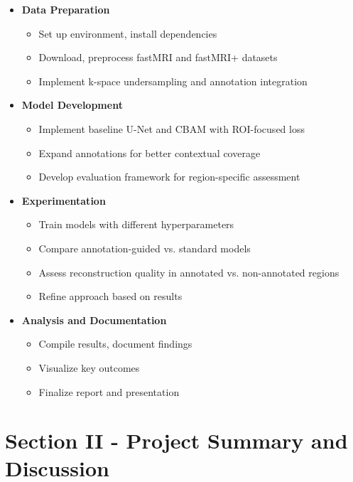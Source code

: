 \documentclass[
	letterpaper, %
]{jdf}
\begin{document}
\begin{itemize}
    \item \textbf{Data Preparation}
    \begin{itemize}
        \item Set up environment, install dependencies
        \item Download, preprocess fastMRI and fastMRI+ datasets
        \item Implement k-space undersampling and annotation integration
    \end{itemize}
    
    \item \textbf{Model Development}
    \begin{itemize}
        \item Implement baseline U-Net and CBAM with ROI-focused loss
        \item Expand annotations for better contextual coverage
        \item Develop evaluation framework for region-specific assessment
    \end{itemize}
    
    \item \textbf{Experimentation}
    \begin{itemize}
        \item Train models with different hyperparameters
        \item Compare annotation-guided vs. standard models
        \item Assess reconstruction quality in annotated vs. non-annotated regions
        \item Refine approach based on results
    \end{itemize}
    
    \item \textbf{Analysis and Documentation}
    \begin{itemize}
        \item Compile results, document findings
        \item Visualize key outcomes
        \item Finalize report and presentation
    \end{itemize}
\end{itemize}

\clearpage

\section{Section II - Project Summary and Discussion}
\end{document}
